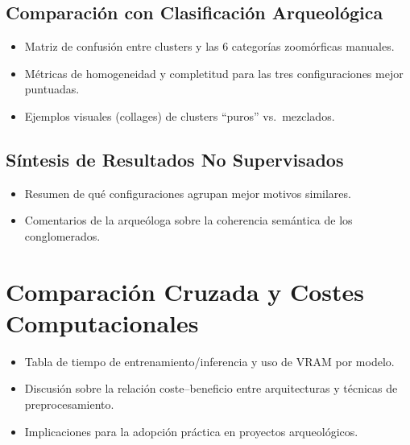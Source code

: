 \subsection{Comparación con Clasificación Arqueológica}
\begin{itemize}
  \item Matriz de confusión entre clusters y las 6 categorías zoomórficas manuales.
  \item Métricas de homogeneidad y completitud para las tres configuraciones mejor puntuadas.
  \item Ejemplos visuales (collages) de clusters “puros” vs.\ mezclados.
\end{itemize}

\subsection{Síntesis de Resultados No Supervisados}
\begin{itemize}
  \item Resumen de qué configuraciones agrupan mejor motivos similares.
  \item Comentarios de la arqueóloga sobre la coherencia semántica de los conglomerados.
\end{itemize}

\section{Comparación Cruzada y Costes Computacionales}

\begin{itemize}
  \item Tabla de tiempo de entrenamiento/inferencia y uso de VRAM por modelo.
  \item Discusión sobre la relación coste–beneficio entre arquitecturas y técnicas de preprocesamiento.
  \item Implicaciones para la adopción práctica en proyectos arqueológicos.
\end{itemize}
